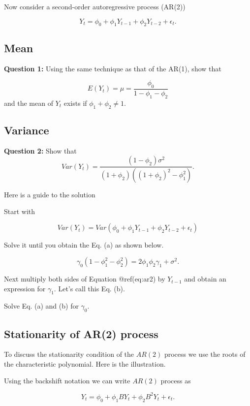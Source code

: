 \documentclass[
  11pt,
  a4paper,
]{report}
\begin{document}
Now consider a second-order autoregressive process (AR(2))

\begin{equation}
Y_t=\phi_0+\phi_1Y_{t-1}+\phi_2Y_{t-2}+\epsilon_t.
\end{equation}

\subsection{Mean}\label{mean-1}

\textbf{Question 1:} Using the same technique as that of the AR(1), show
that

\[E(Y_t) = \mu = \frac{\phi_0}{1-\phi_1 - \phi_2}\] and the mean of
\(Y_t\) exists if \(\phi_1 + \phi_2 \neq 1\).

\subsection{Variance}\label{variance}

\textbf{Question 2:} Show that
\[Var(Y_t) = \frac{(1-\phi_2)\sigma^2}{(1+\phi_2)((1+\phi_2)^2-\phi_1^2)}.\]

Here is a guide to the solution

Start with

\[Var(Y_t)=Var(\phi_0+\phi_1Y_{t-1}+\phi_2Y_{t-2}+\epsilon_t)\]

Solve it until you obtain the Eq. (a) as shown below.

\begin{equation}
\gamma_0 (1-\phi_1^2 - \phi_2^2) = 2\phi_1\phi_2\gamma_1+\sigma^2.
\end{equation}

Next multiply both sides of Equation @ref(eq:ar2) by \(Y_{t-1}\) and
obtain an expression for \(\gamma_1\). Let's call this Eq. (b).

Solve Eq. (a) and (b) for \(\gamma_0.\)

\subsection{Stationarity of AR(2)
process}\label{stationarity-of-ar2-process}

To discuss the stationarity condition of the \(AR(2)\) process we use
the roots of the characteristic polynomial. Here is the illustration.

Using the backshift notation we can write \(AR(2)\) process as

\[Y_t = \phi_0 + \phi_1 BY_{t} + \phi_2 B^2 Y_{t} + \epsilon_t.\]
\end{document}
